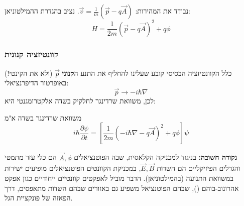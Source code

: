 נבודד את המהירות: $\vec{v} = \frac{1}{m}(\vec{p} - q\vec{A})$. נציב בהגדרת ההמילטוניאן:
\begin{equation}
    H = \frac{1}{2m}(\vec{p} - q\vec{A})^2 + q\phi
\end{equation}

\subsubsection{קוונטיזציה קנונית}
כלל הקוונטיזציה הבסיסי קובע שעלינו להחליף את התנע ה\textbf{קנוני} $\vec{p}$ (ולא את הקינטי!) באופרטור הדיפרנציאלי:
\begin{equation}
    \vec{p} \to -i\hbar \nabla
\end{equation}
לכן, משוואת שרדינגר לחלקיק בשדה אלקטרומגנטי היא:
\begin{resultbox}{משוואת שרדינגר בשדה א"מ}
\begin{equation}
    i\hbar \frac{\partial \psi}{\partial t} = \left[ \frac{1}{2m} \left( -i\hbar\nabla - q\vec{A} \right)^2 + q\phi \right] \psi
\end{equation}
\end{resultbox}

\textbf{נקודה חשובה:} בניגוד למכניקה הקלאסית, שבה הפוטנציאלים $\vec{A}, \phi$ הם כלי עזר מתמטי והגדלים הפיזיקליים הם השדות $\vec{E}, \vec{B}$, במכניקת הקוונטים הפוטנציאלים מופיעים ישירות במשוואת התנועה (בהמילטוניאן). הדבר מוביל לאפקטים קוונטיים ייחודיים כגון אפקט אהרונוב-בוהם (), שבהם הפוטנציאל משפיע גם באזורים שבהם השדות מתאפסים, דרך הפאזה של פונקציית הגל.